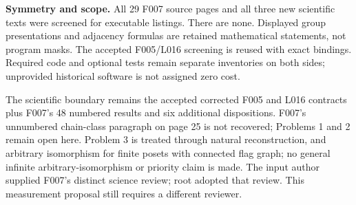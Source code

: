 \documentclass[a4paper,11pt]{article}
\begin{document}
\textbf{Symmetry and scope.}
All 29 F007 source pages and all three new scientific texts were screened
for executable listings. There are none. Displayed group presentations and
adjacency formulas are retained mathematical statements, not program masks.
The accepted F005/L016 screening is reused with exact bindings. Required
code and optional tests remain separate inventories on both sides;
unprovided historical software is not assigned zero cost.

The scientific boundary remains the accepted corrected F005 and L016
contracts plus F007's 48 numbered results and six additional dispositions.
F007's unnumbered chain-class paragraph on page 25 is not recovered;
Problems 1 and 2 remain open here. Problem 3 is treated through natural
reconstruction, and arbitrary isomorphism for finite posets with connected
flag graph; no general infinite arbitrary-isomorphism or priority claim is
made. The input author supplied F007's distinct science review; root adopted
that review. This measurement proposal still requires a different reviewer.
\end{document}
